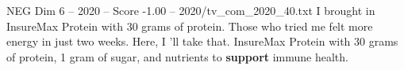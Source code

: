 \begin{textsample}{NEG Dim 6 – 2020 – Score -1.00 – 2020/tv\_com\_2020\_40.txt}  \label{ex:f6_neg_060}
I brought in InsureMax Protein with 30 grams of protein.
Those who tried me felt more energy in just two weeks.
Here, I 'll take that.
InsureMax Protein with 30 grams of protein, 1 gram of sugar, and nutrients to \textbf{support} immune health.

\end{textsample}
